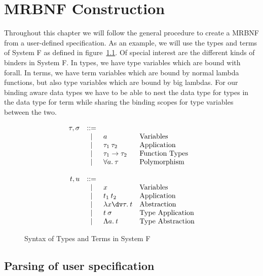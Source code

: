 \chapter{MRBNF Construction}

Throughout this chapter we will follow the general procedure to create a \ac{MRBNF} from a user-defined specification. As an example, we will use the types and terms of System F as defined in figure~\ref{fig:systemf_syntax}. Of special interest are the different kinds of binders in System F. In types, we have type variables which are bound with forall. In terms, we have term variables which are bound by normal lambda functions, but also type variables which are bound by big lambdas. For our binding aware data types we have to be able to nest the data type for types in the data type for term while sharing the binding scopes for type variables between the two.

\begin{figure}[H]
\[
\begin{array}{rcll}
\tau, \sigma & \bnfeq &  & \\ %
& \bnfor & a & \text{Variables} \\
& \bnfor & \tau_1 \: \tau_2 & \text{Application} \\
& \bnfor & \tau_1 \to \tau_2 & \text{Function Types} \\
& \bnfor & \forall a. \: \tau & \text{Polymorphism} \\
& & & \\
t, u & \bnfeq & & \\
& \bnfor & x & \text{Variables} \\
& \bnfor & t_1 \: t_2 & \text{Application} \\
& \bnfor & \lambda x\dv\tau. \: t & \text{Abstraction} \\
& \bnfor & t \: \sigma & \text{Type Application} \\
& \bnfor & \Lambda a . \: t & \text{Type Abstraction} \\
\end{array}
\]
\caption{Syntax of Types and Terms in System F}
\label{fig:systemf_syntax}
\end{figure}

\section{Parsing of user specification}

